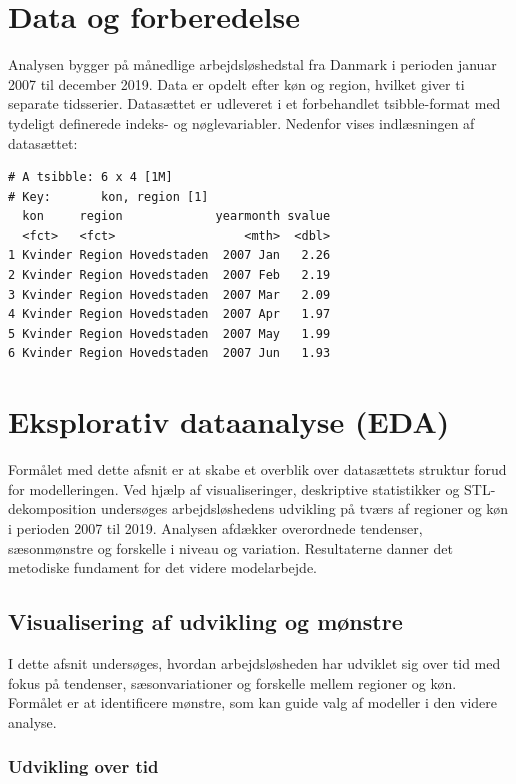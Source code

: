 \documentclass[
]{article}
\begin{document}
\section{Data og forberedelse}\label{data-og-forberedelse}

Analysen bygger på månedlige arbejdsløshedstal fra Danmark i perioden
januar 2007 til december 2019. Data er opdelt efter køn og region,
hvilket giver ti separate tidsserier. Datasættet er udleveret i et
forbehandlet tsibble-format med tydeligt definerede indeks- og
nøglevariabler. Nedenfor vises indlæsningen af datasættet:

\begin{verbatim}
# A tsibble: 6 x 4 [1M]
# Key:       kon, region [1]
  kon     region             yearmonth svalue
  <fct>   <fct>                  <mth>  <dbl>
1 Kvinder Region Hovedstaden  2007 Jan   2.26
2 Kvinder Region Hovedstaden  2007 Feb   2.19
3 Kvinder Region Hovedstaden  2007 Mar   2.09
4 Kvinder Region Hovedstaden  2007 Apr   1.97
5 Kvinder Region Hovedstaden  2007 May   1.99
6 Kvinder Region Hovedstaden  2007 Jun   1.93
\end{verbatim}

\section{Eksplorativ dataanalyse
(EDA)}\label{eksplorativ-dataanalyse-eda}

Formålet med dette afsnit er at skabe et overblik over datasættets
struktur forud for modelleringen. Ved hjælp af visualiseringer,
deskriptive statistikker og STL-dekomposition undersøges
arbejdsløshedens udvikling på tværs af regioner og køn i perioden 2007
til 2019. Analysen afdækker overordnede tendenser, sæsonmønstre og
forskelle i niveau og variation. Resultaterne danner det metodiske
fundament for det videre modelarbejde.

\subsection{Visualisering af udvikling og
mønstre}\label{visualisering-af-udvikling-og-muxf8nstre}

I dette afsnit undersøges, hvordan arbejdsløsheden har udviklet sig over
tid med fokus på tendenser, sæsonvariationer og forskelle mellem
regioner og køn. Formålet er at identificere mønstre, som kan guide valg
af modeller i den videre analyse.

\subsubsection{Udvikling over tid}\label{udvikling-over-tid}
\end{document}
